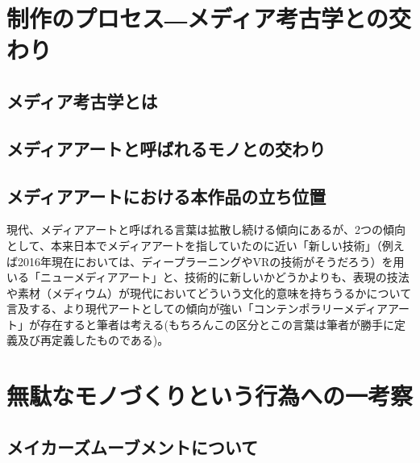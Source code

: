 \chapter{制作のプロセス―メディア考古学との交わり}\label{ux5236ux4f5cux306eux30d7ux30edux30bbux30b9ux30e1ux30c7ux30a3ux30a2ux8003ux53e4ux5b66ux3068ux306eux4ea4ux308fux308a}

\section{メディア考古学とは}\label{ux30e1ux30c7ux30a3ux30a2ux8003ux53e4ux5b66ux3068ux306f}

\section{メディアアートと呼ばれるモノとの交わり}\label{ux30e1ux30c7ux30a3ux30a2ux30a2ux30fcux30c8ux3068ux547cux3070ux308cux308bux30e2ux30ceux3068ux306eux4ea4ux308fux308a}

\section{メディアアートにおける本作品の立ち位置}\label{ux30e1ux30c7ux30a3ux30a2ux30a2ux30fcux30c8ux306bux304aux3051ux308bux672cux4f5cux54c1ux306eux7acbux3061ux4f4dux7f6e}

現代、メディアアートと呼ばれる言葉は拡散し続ける傾向にあるが、2つの傾向として、本来日本でメディアアートを指していたのに近い「新しい技術」（例えば2016年現在においては、ディープラーニングやVRの技術がそうだろう）を用いる「ニューメディアアート」と、技術的に新しいかどうかよりも、表現の技法や素材（メディウム）が現代においてどういう文化的意味を持ちうるかについて言及する、より現代アートとしての傾向が強い「コンテンポラリーメディアアート」が存在すると筆者は考える(もちろんこの区分とこの言葉は筆者が勝手に定義及び再定義したものである)。

\chapter{無駄なモノづくりという行為への一考察}\label{ux7121ux99c4ux306aux30e2ux30ceux3065ux304fux308aux3068ux3044ux3046ux884cux70baux3078ux306eux4e00ux8003ux5bdf}

\section{メイカーズムーブメントについて}\label{ux30e1ux30a4ux30abux30fcux30baux30e0ux30fcux30d6ux30e1ux30f3ux30c8ux306bux3064ux3044ux3066}


